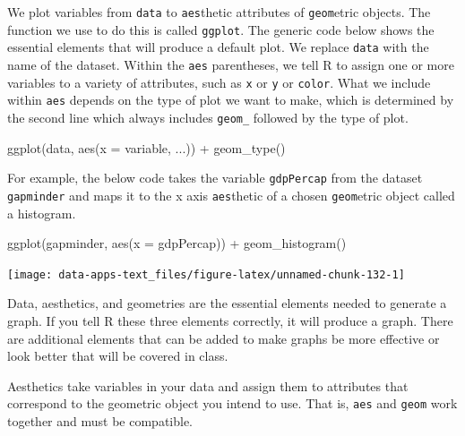 \documentclass[
]{book}
\makeatletter
\newenvironment{Shaded}{\begin{snugshade}}{\end{snugshade}}
\newcommand{\AttributeTok}[1]{\textcolor[rgb]{0.61,0.61,0.61}{#1}}
\newcommand{\FunctionTok}[1]{\textcolor[rgb]{0,0,0}{#1}}
\newcommand{\NormalTok}[1]{#1}
\newcommand{\SpecialCharTok}[1]{\textcolor[rgb]{0,0,0}{#1}}
\newenvironment{kframe}{%
\medskip{}
\setlength{\fboxsep}{.8em}
 \def\at@end@of@kframe{}%
 \ifinner\ifhmode%
  \def\at@end@of@kframe{\end{minipage}}%
  \begin{minipage}{\columnwidth}%
 \fi\fi%
 \def\FrameCommand##1{\hskip\@totalleftmargin \hskip-\fboxsep
 \colorbox{shadecolor}{##1}\hskip-\fboxsep
     \hskip-\linewidth \hskip-\@totalleftmargin \hskip\columnwidth}%
 \MakeFramed {\advance\hsize-\width
   \@totalleftmargin\z@ \linewidth\hsize
   \@setminipage}}%
 {\par\unskip\endMakeFramed%
 \at@end@of@kframe}
\renewenvironment{Shaded}{\begin{kframe}}{\end{kframe}}
\makeatother
\begin{document}
We plot variables from \texttt{data} to \texttt{aes}thetic attributes of \texttt{geom}etric objects. The function we use to do this is called \texttt{ggplot}. The generic code below shows the essential elements that will produce a default plot. We replace \texttt{data} with the name of the dataset. Within the \texttt{aes} parentheses, we tell R to assign one or more variables to a variety of attributes, such as \texttt{x} or \texttt{y} or \texttt{color}. What we include within \texttt{aes} depends on the type of plot we want to make, which is determined by the second line which always includes \texttt{geom\_} followed by the type of plot.

\begin{Shaded}
\begin{Highlighting}[]
\FunctionTok{ggplot}\NormalTok{(data, }\FunctionTok{aes}\NormalTok{(}\AttributeTok{x =}\NormalTok{ variable, ...)) }\SpecialCharTok{+}
  \FunctionTok{geom\_type}\NormalTok{()}
\end{Highlighting}
\end{Shaded}

For example, the below code takes the variable \texttt{gdpPercap} from the dataset \texttt{gapminder} and maps it to the x axis \texttt{aes}thetic of a chosen \texttt{geom}etric object called a histogram.

\begin{Shaded}
\begin{Highlighting}[]
\FunctionTok{ggplot}\NormalTok{(gapminder, }\FunctionTok{aes}\NormalTok{(}\AttributeTok{x =}\NormalTok{ gdpPercap)) }\SpecialCharTok{+}
  \FunctionTok{geom\_histogram}\NormalTok{()}
\end{Highlighting}
\end{Shaded}

\begin{center}\texttt{[image: data-apps-text\_files/figure-latex/unnamed-chunk-132-1]} \end{center}

Data, aesthetics, and geometries are the essential elements needed to generate a graph. If you tell R these three elements correctly, it will produce a graph. There are additional elements that can be added to make graphs be more effective or look better that will be covered in class.

Aesthetics take variables in your data and assign them to attributes that correspond to the geometric object you intend to use. That is, \texttt{aes} and \texttt{geom} work together and must be compatible.
\end{document}
